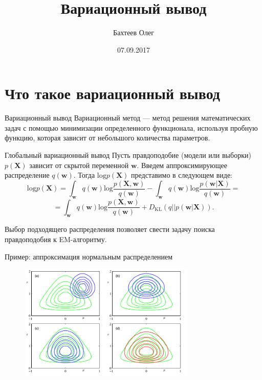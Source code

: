 \documentclass[10pt,pdf,utf8,russian,aspectratio=169]{beamer}
\title[Вариационный вывод]{Вариационный вывод}
\author{Бахтеев Олег}
\institute{МФТИ}
\date{07.09.2017}
\begin{document}
\begin{frame}
  \titlepage
\end{frame}


\section{Что такое вариационный вывод}
\begin{frame}{Вариационный вывод}
Вариационный метод — метод решения математических задач с помощью минимизации определенного функционала, используя пробную функцию, которая зависит от небольшого количества параметров.
\end{frame}

\begin{frame}{Глобальный вариационный вывод}
Пусть правдоподобие (модели или выборки) $p(\mathbf{X})$ зависит от скрытой переменной $\mathbf{w}$. Введем аппроксимирующее распределение $q(\mathbf{w})$.
Тогда $\text{log} p(\mathbf{X})$ представимо в следующем виде:
\[
    \text{log} p(\mathbf{X}) = \int_{\mathbf{w}} q(\mathbf{w}) \text{log}\frac{p(\mathbf{X}, \mathbf{w}) }{q(\mathbf{w})} - \int_{\mathbf{w}} q(\mathbf{w}) \text{log}\frac{p(\mathbf{w}| \mathbf{X}) }{q(\mathbf{w})} =
\]
\[=    \int_{\mathbf{w}} q(\mathbf{w}) \text{log}\frac{p(\mathbf{X}, \mathbf{w}) }{q(\mathbf{w})} + D_\text{KL}(q||p(\mathbf{w}|\mathbf{X})).
\]

Выбор подходящего распределения позволяет свести задачу поиска правдоподобия к EM-алгоритму.
\end{frame}

\begin{frame}{Пример: аппроксимация нормальным распределением}
\begin{figure}
  \centering
  {\includegraphics[width=0.75\textwidth]{omnomnom.png}} 
\label{fig:1}\qquad
\end{figure}
\end{frame}
\end{document}
